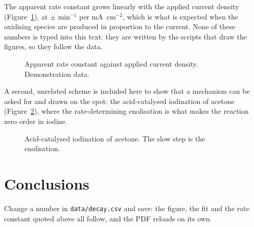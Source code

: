 \documentclass[journal=jacsat,manuscript=article]{achemso}
\begin{document}
The apparent rate constant grows linearly with the applied current density
(Figure~\ref{fig:kapp}), at \FitKappSlope{} $\pm$ \FitKappSlopeError{} min$^{-1}$ per
mA~cm$^{-2}$, which is what is expected when the oxidising species are produced in proportion
to the current. None of these numbers is typed into this text: they are written by the scripts
that draw the figures, so they follow the data.

\begin{figure}
  \centering
  \caption{Apparent rate constant against applied current density. Demonstration data.}
  \label{fig:kapp}
\end{figure}

A second, unrelated scheme is included here to show that a mechanism can be asked for and
drawn on the spot: the acid-catalysed iodination of acetone (Figure~\ref{fig:iodination}), where
the rate-determining enolisation is what makes the reaction zero order in iodine.

\begin{figure}
  \centering
  \caption{Acid-catalysed iodination of acetone. The slow step is the enolisation.}
  \label{fig:iodination}
\end{figure}

\section{Conclusions}

Change a number in \texttt{data/decay.csv} and save: the figure, the fit and the rate constant
quoted above all follow, and the PDF reloads on its own.


\end{document}
